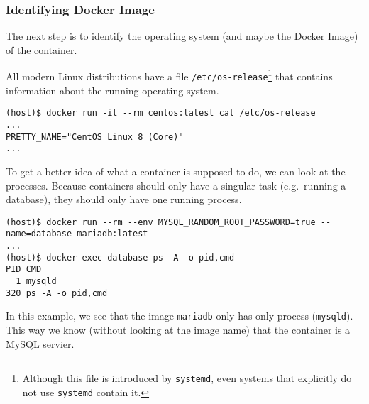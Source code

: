 \subsubsection{Identifying Docker Image}

The next step is to identify the operating system (and maybe the Docker Image) of the container.

All modern Linux distributions have a file \lstinline{/etc/os-release}\footnote{Although this file is introduced by \lstinline{systemd}, even systems that explicitly do not use \lstinline{systemd} contain it.} that contains information about the running operating system.
\begin{lstlisting}
(host)$ docker run -it --rm centos:latest cat /etc/os-release
...
PRETTY_NAME="CentOS Linux 8 (Core)"
...
\end{lstlisting}

\hfill

To get a better idea of what a container is supposed to do, we can look at the processes. Because containers should only have a singular task (e.g.\ running a database), they should only have one running process. 

\begin{lstlisting}
(host)$ docker run --rm --env MYSQL_RANDOM_ROOT_PASSWORD=true --name=database mariadb:latest
...
(host)$ docker exec database ps -A -o pid,cmd
PID CMD
  1 mysqld
320 ps -A -o pid,cmd
\end{lstlisting}

In this example, we see that the image \lstinline{mariadb} only has only process (\lstinline{mysqld}). This way we know (without looking at the image name) that the container is a MySQL servier.
